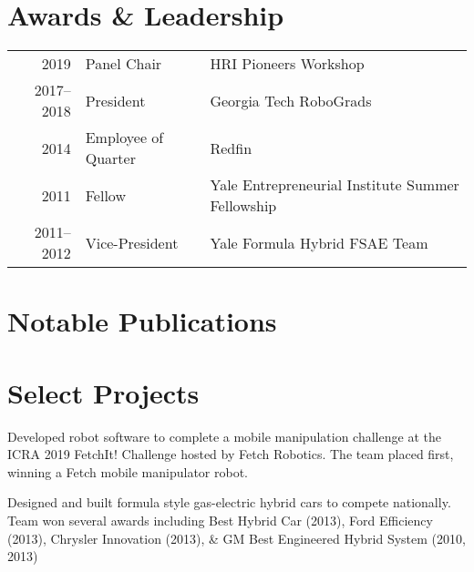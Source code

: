 \documentclass[]{deedy-resume}
\begin{document}
\begin{minipage}[t]{0.66\textwidth}

\vspace{-0.3cm}
\section{Awards \& Leadership}
\begin{tabular}{rll}
2019 & Panel Chair & HRI Pioneers Workshop \\
2017--2018 & President & Georgia Tech RoboGrads \\
2014 & Employee of Quarter & Redfin \\
2011 & Fellow & Yale Entrepreneurial Institute Summer Fellowship \\
2011--2012 & Vice-President & Yale Formula Hybrid FSAE Team
\end{tabular}
\sectionsep


\vspace{-0.3cm}
\section{Notable Publications}
\patchcmd{\thebibliography}
  {\settowidth}
  {\setlength{\parsep}{0pt}\setlength{\itemsep}{0pt plus 0.1pt}\settowidth}
  {}{}
\renewcommand\refname{\vskip -0.9cm} %


\nocite{*}


\vspace{-0.3cm}
\section{Select Projects}
Developed robot software to complete a mobile manipulation challenge at the ICRA 2019 FetchIt! Challenge hosted by Fetch Robotics. The team placed first, winning a Fetch mobile manipulator robot.
\sectionsep

Designed and built formula style gas-electric hybrid cars to compete nationally. Team won several awards including Best Hybrid Car (2013), Ford Efficiency (2013), Chrysler Innovation (2013), \& GM Best Engineered Hybrid System (2010, 2013)

\end{minipage}
\end{document}
